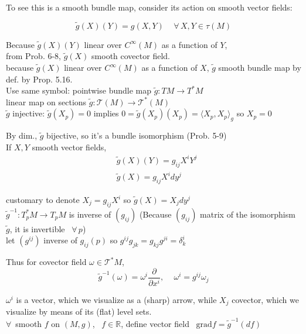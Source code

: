 \documentclass[11pt]{amsart}
\theoremstyle{definition}
\begin{document}
To see this is a smooth bundle map, consider its action on smooth vector fields:

\[
\widetilde{g}(X)(Y) = g(X,Y) \quad \, \forall \, X,Y \in \tau(M)
\]

Because $\widetilde{g}(X)(Y)$ linear over $C^{\infty}(M)$ as a function of $Y$, \\
\quad from Prob. 6-8, $\widetilde{g}(X)$ smooth covector field. \\
\quad because $\widetilde{g}(X)$ linear over $C^{\infty}(M)$ as a function of $X$, $\widetilde{g}$ smooth bundle map by def. by Prop. 5.16. \\

Use same symbol: pointwise bundle map $\widetilde{g}:TM \to T^*M$ \\
\phantom{Use same symbol:} linear map on sections $\widetilde{g}: \mathcal{T}(M) \to \mathcal{T}^*(M)$  \\

$\widetilde{g}$ injective: $\widetilde{g}(X_p) = 0$ implies $0 = \widetilde{g}(X_p)(X_p) = \langle X_p, X_p \rangle_g$ so $X_p =0$

By dim., $\widetilde{g}$ bijective, so it's a bundle isomorphism (Prob. 5-9) \\

If $X,Y$ smooth vector fields,
\[
\begin{aligned}
  & \widetilde{g}(X)(Y) = g_{ij} X^i Y^j \\
  &  \widetilde{g}(X) = g_{ij} X^i dy^j
\end{aligned}
\]

customary to denote $X_j = g_{ij} X^i$ so $\widetilde{g}(X) = X_j dy^j$ \\

$\widetilde{g}^{-1}:T_p^*M\to T_pM$ is inverse of $(g_{ij})$ (Because $(g_{ij})$ matrix of the isomorphism $\widetilde{g}$, it is invertible \, $\forall \, p$) \\
\quad let $(g^{ij})$ inverse of $g_{ij}(p)$ so $g^{ij}g_{jk} = g_{kj} g^{ji} = \delta^i_k$

Thus for covector field $\omega \in \mathcal{T}^*M$,
\[
\widetilde{g}^{-1}(\omega) = \omega^i \frac{ \partial}{ \partial x^i},  \quad \, \omega^i = g^{ij} \omega_j
\]

$\omega^i$ is a vector, which we visualize as a (sharp) arrow, while $X_j$ covector, which we visualize by means of its (flat) level sets.  \\

$\forall \, $ smooth $f$ on $(M,g)$, \, $f\in \mathbb{R}$, define vector field \quad \, $\text{grad}{f} =  \widetilde{g}^{-1}(df)$ \\
\end{document}
